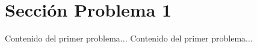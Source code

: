 \documentclass{IEEEcsmag}
\begin{document}
\section{Sección Problema 1}
Contenido del primer problema...
\newpage
Contenido del primer problema...
\end{document}
